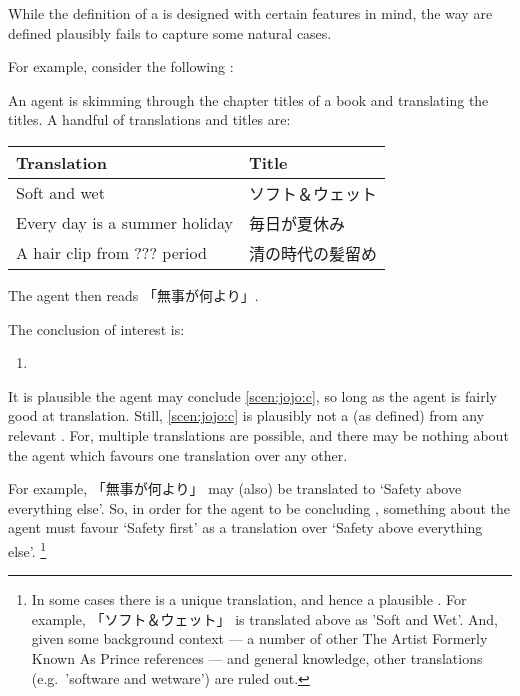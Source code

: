 \begin{note}
  While the definition of a  is designed with certain features in mind, the way  are defined plausibly fails to capture some natural cases.

  For example, consider the following :

  \begin{scenario}[ジョジョリオン]%
    \label{scen:jojo}%
    \nocite{huangmufeiluyan:2011aa}%
    An agent is skimming through the chapter titles of a book and translating the titles.
    A handful of translations and titles are:

    \begin{center}
      \bgroup
      \def\arraystretch{1.125}
      \begin{tabular}{R{.45\textwidth} L{.45\textwidth}}
        Translation & Title \\
        \hline
        Soft and wet & ソフト＆ウェット \\
        Every day is a summer holiday & 毎日が夏休み \\
        A hair clip from ??? period & 清の時代の髪留め \\
      \end{tabular}
      \egroup
    \end{center}

    \noindent%
    The agent then reads 「無事が何より」.
  \end{scenario}

  \noindent%
  The conclusion of interest is:
  \begin{enumerate}[label=C\thescenarioCounter., ref=C\thescenarioCounter]
  \item
    \label{scen:jojo:c}
  \end{enumerate}

  \noindent%
  It is plausible the agent may conclude \ref{scen:jojo:c}, so long as the agent is fairly good at translation.
  Still, \ref{scen:jojo:c} is plausibly not a \fc{} (as defined) from any relevant \pool{}.
  For, multiple translations are possible, and there may be nothing about the agent which favours one translation over any other.

  For example, 「無事が何より」 may (also) be translated to `Safety above everything else'.
  So, in order for the agent to be concluding , something about the agent must favour `Safety first' as a translation over `Safety above everything else'.%
  \footnote{
    In some cases there is a unique translation, and hence a plausible \fc{}.
    For example, 「ソフト＆ウェット」 is translated above as 'Soft and Wet'.
    And, given some background context --- a number of other The Artist Formerly Known As Prince references --- and general knowledge, other translations (e.g.\ 'software and wetware') are ruled out.
  }
\end{note}

